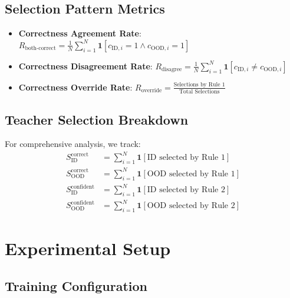 \documentclass[11pt,a4paper]{article}
\begin{document}
\subsection{Selection Pattern Metrics}

\begin{itemize}
\item \textbf{Correctness Agreement Rate}: $R_{\text{both-correct}} = \frac{1}{N} \sum_{i=1}^{N} \mathbf{1}[c_{\text{ID},i} = 1 \land c_{\text{OOD},i} = 1]$
\item \textbf{Correctness Disagreement Rate}: $R_{\text{disagree}} = \frac{1}{N} \sum_{i=1}^{N} \mathbf{1}[c_{\text{ID},i} \neq c_{\text{OOD},i}]$
\item \textbf{Correctness Override Rate}: $R_{\text{override}} = \frac{\text{Selections by Rule 1}}{\text{Total Selections}}$
\end{itemize}

\subsection{Teacher Selection Breakdown}

For comprehensive analysis, we track:
\begin{align}
S_{\text{ID}}^{\text{correct}} &= \sum_{i=1}^{N} \mathbf{1}[\text{ID selected by Rule 1}] \\
S_{\text{OOD}}^{\text{correct}} &= \sum_{i=1}^{N} \mathbf{1}[\text{OOD selected by Rule 1}] \\
S_{\text{ID}}^{\text{confident}} &= \sum_{i=1}^{N} \mathbf{1}[\text{ID selected by Rule 2}] \\
S_{\text{OOD}}^{\text{confident}} &= \sum_{i=1}^{N} \mathbf{1}[\text{OOD selected by Rule 2}]
\end{align}

\section{Experimental Setup}

\subsection{Training Configuration}
\end{document}
